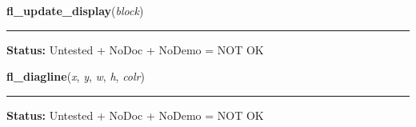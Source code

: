     \label{xformslib:library:fl_update_display}

    \vspace{0.5ex}

\hspace{.8\funcindent}\begin{boxedminipage}{\funcwidth}

    \raggedright \textbf{fl\_update\_display}(\textit{block})

    \vspace{-1.5ex}

    \rule{\textwidth}{0.5\fboxrule}
\setlength{\parskip}{2ex}
\setlength{\parskip}{1ex}
\textbf{Status:} Untested + NoDoc + NoDemo = NOT OK



    \end{boxedminipage}

    \label{xformslib:library:fl_diagline}

    \vspace{0.5ex}

\hspace{.8\funcindent}\begin{boxedminipage}{\funcwidth}

    \raggedright \textbf{fl\_diagline}(\textit{x}, \textit{y}, \textit{w}, \textit{h}, \textit{colr})

    \vspace{-1.5ex}

    \rule{\textwidth}{0.5\fboxrule}
\setlength{\parskip}{2ex}
\setlength{\parskip}{1ex}
\textbf{Status:} Untested + NoDoc + NoDemo = NOT OK



    \end{boxedminipage}

    \label{xformslib:library:fl_linewidth}

    \vspace{0.5ex}

